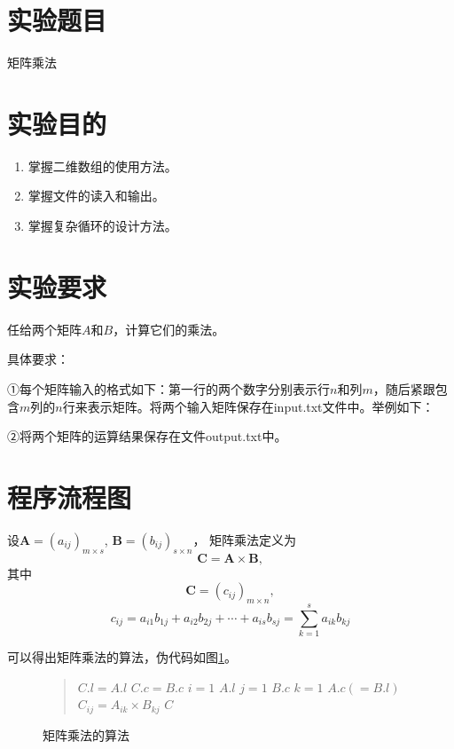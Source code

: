 \documentclass[cs4size,a4paper,nofonts]{ctexart}
\begin{document}
\newpage

\section{实验题目}
矩阵乘法
\section{实验目的}
\begin{enumerate}[topsep=0pt,partopsep=0pt,itemsep=0pt,parsep=0pt]
\item 掌握二维数组的使用方法。 
\item 掌握文件的读入和输出。 
\item 掌握复杂循环的设计方法。
\end{enumerate}
\section{实验要求}
任给两个矩阵$A$和$B$，计算它们的乘法。

具体要求：

①每个矩阵输入的格式如下：第一行的两个数字分别表示行$n$和列$m$，随后紧跟包含$m$列的$n$行来表示矩阵。将两个输入矩阵保存在input.txt文件中。举例如下：
\begin{quote}

\end{quote}

②将两个矩阵的运算结果保存在文件output.txt中。

\section{程序流程图}

设$\bm A = (a_{ij})_{m \times s}$, $\bm B = (b_{ij})_{s \times n}$，
矩阵乘法定义为$$\bm C=\bm A\times \bm B,$$
其中 $$\bm C=(c_{ij})_{m\times n},$$
$$c_{ij} = a_{i1}b_{1j} + a_{i2}b_{2j} + \cdots + a_{is}b_{sj}
= \sum_{k=1}^{s}{a_{ik}b_{kj}}$$

可以得出矩阵乘法的算法，伪代码如图\ref{mul}。
\begin{figure}[htp]
\begin{quote}
\begin{codebox}
\li $C.l = A.l$
\li $C.c = B.c$
\li \For $i = 1$ \To $A.l$ \Do
\li   \For $j = 1$ \To $B.c$ \Do
\li     \For $k = 1$ \To $A.c(=B.l)$ \Do
\li       $C_{ij} = A_{ik}\times B_{kj}$
        \End
      \End
    \End
\li \Return $C$
\end{codebox}
\end{quote}
\caption{\label{mul}矩阵乘法的算法}
\end{figure}
\end{document}
